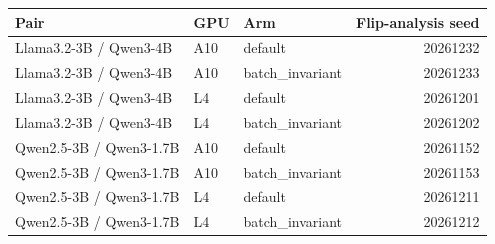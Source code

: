 \begin{tabular}{lllr}
\toprule
Pair & GPU & Arm & Flip-analysis seed \\
\midrule
Llama3.2-3B / Qwen3-4B & A10 & default & 20261232 \\
Llama3.2-3B / Qwen3-4B & A10 & batch\_invariant & 20261233 \\
Llama3.2-3B / Qwen3-4B & L4 & default & 20261201 \\
Llama3.2-3B / Qwen3-4B & L4 & batch\_invariant & 20261202 \\
Qwen2.5-3B / Qwen3-1.7B & A10 & default & 20261152 \\
Qwen2.5-3B / Qwen3-1.7B & A10 & batch\_invariant & 20261153 \\
Qwen2.5-3B / Qwen3-1.7B & L4 & default & 20261211 \\
Qwen2.5-3B / Qwen3-1.7B & L4 & batch\_invariant & 20261212 \\
\bottomrule
\end{tabular}

